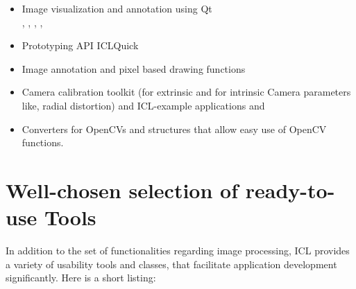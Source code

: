 \begin{itemize}
\item Image visualization and annotation using Qt\\
, , , ,

\item Prototyping API ICLQuick\\

\item Image annotation and pixel based drawing functions\\

\item Camera calibration toolkit (for extrinsic and for intrinsic Camera parameters like, radial distortion)
 and ICL-example applications  and 

\item Converters for OpenCVs  and  structures that allow easy use of OpenCV functions.\\
\end{itemize}



\section{Well-chosen selection of ready-to-use Tools}
In addition to the set of functionalities regarding image processing, ICL provides a variety of usability tools and classes, that facilitate application development significantly. Here is a short listing:

